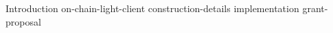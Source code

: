 {Introduction}
{on-chain-light-client}
{construction-details}
{implementation}
{grant-proposal}




